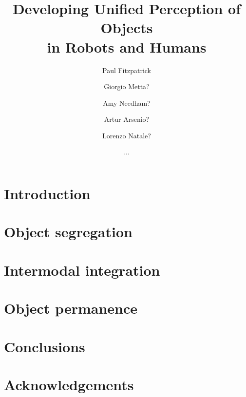 \documentclass[a4]{epirob}
\title{
Developing Unified Perception of Objects \\ in Robots and Humans
}
\author{Paul Fitzpatrick \and Giorgio Metta? \and Amy Needham? \and
Artur Arsenio? \and Lorenzo Natale? \and ...}
\begin{document}
\maketitle


\begin{abstract}

\end{abstract}


\section{Introduction}




\section{Object segregation}




\section{Intermodal integration}




\section{Object permanence}






%



\section{Conclusions}




\section*{Acknowledgements}






\nocite{natale05developmental}
\nocite{arsenio05exploiting}


\end{document}
